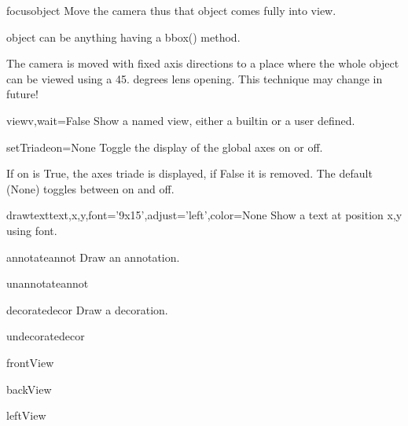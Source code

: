 \begin{funcdesc}{focus}{object}
Move the camera thus that object comes fully into view.

object can be anything having a bbox() method.

The camera is moved with fixed axis directions to a place
where the whole object can be viewed using a 45. degrees lens opening.
This technique may change in future!

\end{funcdesc}

\begin{funcdesc}{view}{v,wait=False}
Show a named view, either a builtin or a user defined.
\end{funcdesc}

\begin{funcdesc}{setTriade}{on=None}
Toggle the display of the global axes on or off.

If on is True, the axes triade is displayed, if False it is
removed. The default (None) toggles between on and off.

\end{funcdesc}

\begin{funcdesc}{drawtext}{text,x,y,font='9x15',adjust='left',color=None}
Show a text at position x,y using font.
\end{funcdesc}

\begin{funcdesc}{annotate}{annot}
Draw an annotation.
\end{funcdesc}

\begin{funcdesc}{unannotate}{annot}
\end{funcdesc}

\begin{funcdesc}{decorate}{decor}
Draw a decoration.
\end{funcdesc}

\begin{funcdesc}{undecorate}{decor}
\end{funcdesc}

\begin{funcdesc}{frontView}{}
\end{funcdesc}

\begin{funcdesc}{backView}{}
\end{funcdesc}

\begin{funcdesc}{leftView}{}
\end{funcdesc}


